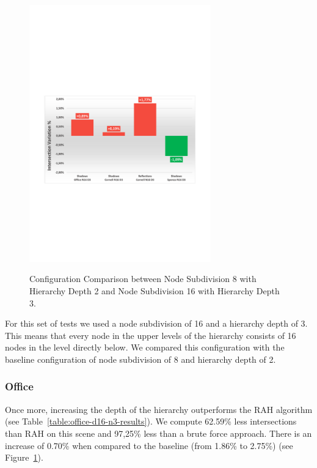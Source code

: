 \begin{figure}[!htb]
    \begin{center}
    \includegraphics[width=0.70\textwidth]{Images/Chart_Comparison_N8_D2_N16_D3}
    \label{fig:comparison-results-d8-n2-d16-n3}
    \caption{Configuration Comparison between Node Subdivision 8 with Hierarchy Depth 2 and Node Subdivision 16 with Hierarchy Depth 3.}
    \end{center}
\end{figure}

For this set of tests we used a node subdivision of 16 and a hierarchy depth of 3. This means that every node in the upper levels of the hierarchy consists of 16 nodes in the level directly below. We compared this configuration with the baseline configuration of node subdivision of 8 and hierarchy depth of 2.

\subsubsection{Office}

Once more, increasing the depth of the hierarchy outperforms the RAH algorithm (see Table~\ref{table:office-d16-n3-results}). We compute 62.59\% less intersections than RAH on this scene and 97,25\% less than a brute force approach. There is an increase of 0.70\% when compared to the baseline (from 1.86\% to 2.75\%) (see Figure~\ref{fig:comparison-results-d8-n2-d16-n3}).


